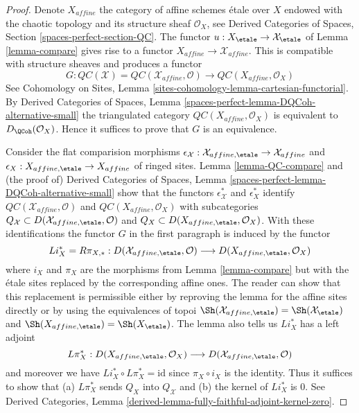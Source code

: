 \begin{proof}
Denote $X_{affine}$ the category of affine schemes \'etale over $X$
endowed with the chaotic topology and its structure sheaf $\mathcal{O}_X$, see
Derived Categories of Spaces, Section \ref{spaces-perfect-section-QC}.
The functor $u : X_\etale \to \mathcal{X}_\etale$ of Lemma \ref{lemma-compare}
gives rise to a functor $X_{affine} \to \mathcal{X}_{affine}$.
This is compatible with structure sheaves and produces a functor
$$
G :
\mathit{QC}(\mathcal{X}) = \mathit{QC}(\mathcal{X}_{affine}, \mathcal{O})
\longrightarrow
\mathit{QC}(X_{affine}, \mathcal{O}_X)
$$
See
Cohomology on Sites, Lemma \ref{sites-cohomology-lemma-cartesian-functorial}.
By Derived Categories of Spaces, Lemma
\ref{spaces-perfect-lemma-DQCoh-alternative-small}
the triangulated category $\mathit{QC}(X_{affine}, \mathcal{O}_X)$
is equivalent to $D_\QCoh(\mathcal{O}_X)$. Hence it suffices to
prove that $G$ is an equivalence.

\medskip\noindent
Consider the flat comparision morphisms
$\epsilon_\mathcal{X} : \mathcal{X}_{affine, \etale} \to \mathcal{X}_{affine}$
and $\epsilon_X : X_{affine, \etale} \to X_{affine}$
of ringed sites. Lemma \ref{lemma-QC-compare} and
(the proof of) Derived Categories of Spaces, Lemma
\ref{spaces-perfect-lemma-DQCoh-alternative-small}
show that the functors
$\epsilon_\mathcal{X}^*$ and $\epsilon_X^*$
identify $\mathit{QC}(\mathcal{X}_{affine}, \mathcal{O})$
and $\mathit{QC}(X_{affine}, \mathcal{O}_X)$
with subcategories
$Q_\mathcal{X} \subset D(\mathcal{X}_{affine, \etale}, \mathcal{O})$
and
$Q_X \subset D(X_{affine, \etale}, \mathcal{O}_X)$.
With these identifications
the functor $G$ in the first paragraph is induced by the functor
$$
Li_X^* = R\pi_{X, *}:
D(\mathcal{X}_{affine, \etale}, \mathcal{O})
\longrightarrow
D(X_{affine, \etale}, \mathcal{O}_X)
$$
where $i_X$ and $\pi_X$ are the morphisms from Lemma \ref{lemma-compare}
but with the \'etale sites replaced by the corresponding affine ones.
The reader can show that this replacement is permissible either
by reproving the lemma for the affine sites directly or
by using the equivalences of topoi
$\Sh(\mathcal{X}_{affine, \etale}) = \Sh(\mathcal{X}_\etale)$ and
$\Sh(X_{affine, \etale}) = \Sh(X_\etale)$.
The lemma also tells us $Li_X^*$ has a left adjoint
$$
L\pi_X^*:
D(X_{affine, \etale}, \mathcal{O}_X)
\longrightarrow
D(\mathcal{X}_{affine, \etale}, \mathcal{O})
$$
and moreover we have $Li_X^* \circ L\pi_X^* = \text{id}$
since $\pi_X \circ i_X$ is the identity. Thus it suffices
to show that (a) $L\pi_X^*$ sends $Q_X$ into $Q_\mathcal{X}$
and (b) the kernel of $Li_X^*$ is $0$.
See Derived Categories, Lemma
\ref{derived-lemma-fully-faithful-adjoint-kernel-zero}.


\end{proof}
